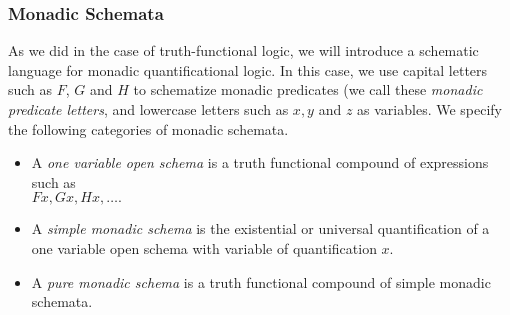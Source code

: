 \subsubsection*{Monadic Schemata}
As we did in the case of truth-functional logic, we will introduce a schematic language for monadic quantificational logic. In this case, we use capital letters such as $F$, $G$ and $H$ to schematize monadic predicates (we call these \emph{monadic predicate letters}, and lowercase letters such as $x, y$ and $z$ as variables. We specify the following categories of monadic schemata.
\begin{itemize}
\item 
A \emph{ one variable open schema} is a truth functional compound of expressions
such as \\
$Fx , Gx , Hx , \ldots .$
\item
A \emph{ simple monadic schema} is the existential or universal quantification of
a one variable open schema with variable of quantification $x.$
\item
A \emph{ pure monadic schema} is a truth functional compound of simple monadic
schemata. 
\end{itemize}